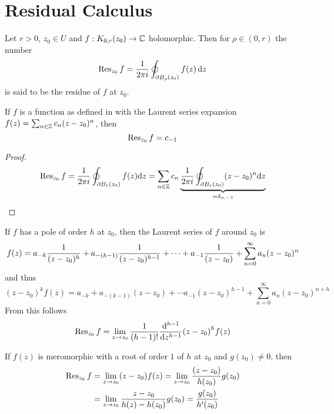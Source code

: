 \documentclass[../../script.tex]{subfiles}
\begin{document}
\section{Residual Calculus}

\begin{defi}[Residue]\label{def:residue}
    Let $r > 0$, $z_0 \in U$ and $f: \cball[0,r] (z_0) \rightarrow \cmpln$ holomorphic.
    Then for $\rho \in (0, r)$ the number 
    \[
        \Res_{z_0} f = \rec{2\pi i} \oint_{\boundary{\oball[\rho](z_0)}} f(z) \dd{z}
    \]
    is said to be the residue of $f$ at $z_0$.
\end{defi}

\begin{lem}
    If $f$ is a function as defined in  with the Laurent series expansion ${f(z) = \sum_{n \in \intn} c_n (z - z_0)^n}$, then 
    \[
        \Res_{z_0} f = c_{-1}
    \]
\end{lem}
\begin{proof}
    \begin{equation}
        \Res_{z_0} f = \rec{2\pi i} \oint_{\boundary{\oball[r](z_0)}} f(z) \dd z = \sum_{n \in \intn} c_n \underbrace{\rec{2\pi i} \oint_{\boundary{\oball[r](z_0)}} (z - z_0)^n \dd z}_{= \delta_{n, -1}} 
    \end{equation}
\end{proof}

\begin{eg}
    If $f$ has a pole of order $h$ at $z_0$, then the Laurent series of $f$ around $z_0$ is 
    \[
        f(z) = a_{-k} \rec{(z - z_0)^h} + a_{-(h - 1)} \rec{(z - z_0)^{h-1}} + \cdots + a_{-1} \rec{(z - z_0)} + \sum_{n=0}^{\infty} a_n (z - z_0)^n
    \]
    and thus 
    \[
        (z - z_0)^k f(z) = a_{-k} + a_{-(k-1)} (z - z_0) + \cdots a_{-1} (z - z_0)^{h - 1} + \sum_{n=0}^{\infty} a_n (z - z_0)^{n + h}
    \]
    From this follows 
    \[
        \Res_{z_0} f = \lim_{z \rightarrow z_0} \rec{(h - 1)!} \dv[h-1]{z} (z - z_0)^h f(z)
    \]
\end{eg}

\begin{eg}
    If $f(z)$ is meromorphic with a root of order $1$ of $h$ at $z_0$ and $g(z_0) \ne 0$, then 
    \begin{align*}
        \Res_{z_0} f &= \lim_{z \rightarrow z_0} (z - z_0) f(z) = \lim_{z \rightarrow z_0} \frac{(z - z_0)}{h(z_0)} g(z_0) \\
        &= \lim_{z \rightarrow z_0} \frac{z - z_0}{h(z) - h(z_0)} g(z_0) = \frac{g(z_0)}{h'(z_0)}
    \end{align*}
\end{eg}
\end{document}
